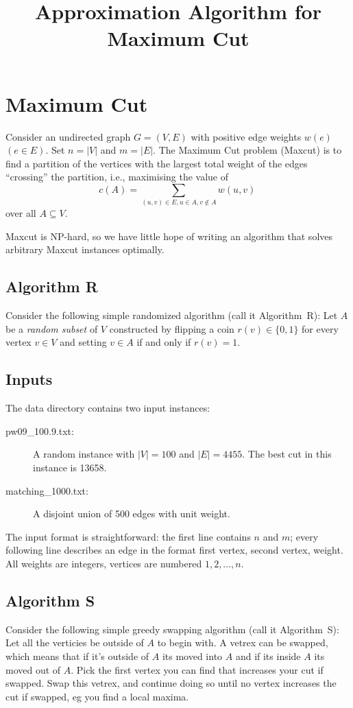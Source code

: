 \documentclass{tufte-handout}
\title{\sf Approximation Algorithm for Maximum Cut}
\begin{document}
\maketitle
{}

\section{Maximum Cut}
Consider an undirected graph $G=(V,E)$ with positive edge weights
$w(e)$ $(e\in E)$.
Set $n=|V|$ and $m=|E|$.
The Maximum Cut problem (Maxcut) is to find a partition of the
vertices with the largest total weight of the edges ``crossing'' the
partition, i.e., maximising the value of \[c(A)= \sum_{(u,v)\in E,
  u\in A, v\notin A} w(u,v)\,\] over all $A\subseteq V$.

Maxcut is NP-hard, so we have little hope of writing an algorithm that
solves arbitrary Maxcut instances optimally.

\subsection{ Algorithm R}

Consider the following simple randomized algorithm (call it
Algorithm~R): Let $A$ be a \emph{random subset} of $V$ constructed by
flipping a coin $r(v)\in\{0,1\}$ for every vertex $v\in V$ and setting
$v\in A$ if and only if $r(v)=1$.

\subsection{Inputs}
The  data directory contains two input instances:
\begin{description}
\item[ pw09\_100.9.txt:] A random instance with $|V|=100$ and
  $|E|=4455$. The best cut in this instance is
  13658.
\item[ matching\_1000.txt:] A disjoint union of 500 edges with unit weight.
\end{description}

The input format is straightforward: the first line contains $n$ and
$m$; every following line describes an edge in the format first
vertex, second vertex, weight.
All weights are integers, vertices are numbered $1,2,\ldots, n$.

\subsection{Algorithm S}
Consider the following simple greedy swapping algorithm (call it 
Algorithm~S): Let all the verticies be outside of $A$ to begin with.
A vetrex can be swapped, which means that if it's outside of $A$ its moved into
$A$ and if its inside $A$ its moved out of $A$.
Pick the first vertex you can find that increases your cut if swapped.
Swap this vetrex, and continue doing so until no vertex increases the cut
if swapped, eg you find a local maxima.
\end{document}
